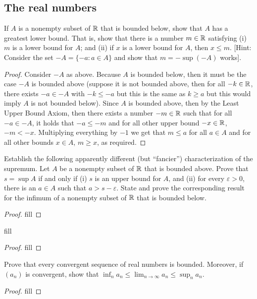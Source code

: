 \subsection{The real numbers}


\begin{exercise}{1}
If $A$ is a nonempty subset of $\mathbb{R}$ that is bounded below, show that $A$ has a greatest lower bound. That is, show that there is a number $m\in\mathbb{R}$ satisfying (i) $m$ is a lower bound for $A$; and (ii) if $x$ is a lower bound for $A$, then $x\leq m$. [Hint: Consider the set $-A=\{-a:a\in A\}$ and show that $m=-\sup(-A)$ works].
\end{exercise}
\begin{proof}
Consider $-A$ as above. Because $A$ is bounded below, then it must be the case $-A$ is bounded above (suppose it is not bounded above, then for all $-k\in\mathbb{R}$, there exists $-a\in -A$ with $-k\leq -a$ but this is the same as $k\geq a$ but this would imply $A$ is not bounded below). Since $A$ is bounded above, then by the Least Upper Bound Axiom, then there exists a number $-m\in\mathbb{R}$ such that for all $-a\in -A$, it holds that $-a\leq -m$ and for all other upper bound $-x\in\mathbb{R}$, $-m<-x$. Multiplying everything by $-1$ we get that $m\leq a$ for all $a\in A$ and for all other bounds $x\in A$, $m\geq x$, as required.
\end{proof}

\begin{exercise}{3}
Establish the following apparently different (but ``fancier'') characterization of the supremum. Let $A$ be a nonempty subset of $\mathbb{R}$ that is bounded above. Prove that $s=\sup A$ if and only if (i) $s$ is an upper bound for $A$, and (ii) for every $\varepsilon>0$, there is an $a\in A$ such that $a>s-\varepsilon$. State and prove the corresponding result for the infimum of a nonempty subset of $\mathbb{R}$ that is bounded below.
\end{exercise}
\begin{proof}
fill
\end{proof}

\begin{exercise}{4}
fill
\end{exercise}
\begin{proof}
fill
\end{proof}

\begin{exercise}{6}
Prove that every convergent sequence of real numbers is bounded. Moreover, if $(a_n)$ is convergent, show that $\inf_na_n\leq \lim_{n\to\infty}a_n\leq\sup_na_n$.
\end{exercise}
\begin{proof}
fill
\end{proof}
